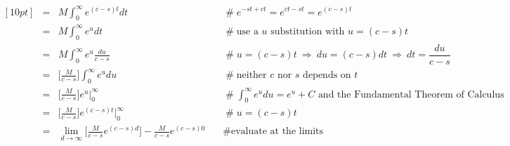 \documentclass{article}
\theoremstyle{definition}
\begin{document}
\begin{equation*}
\begin{array}{lllll}
[10pt]                                                                                 %
&=& M  \int_0^\infty  e^{(c-s)t}  dt                                      &\quad  \mathrel{\#}  e^{-st + ct} = e^{ct -st} = e^{(c-s)t}                                                                                                                                     \\      
[10pt]                                                                                 %
&=&  M \int_0^\infty e^u dt                                                &\quad  \mathrel{\#} \text{use a $u$ substitution with $u = (c-s)t$}                                                                                                                     \\     
[10pt]                                                                                 %
&=&  M \int_0^\infty e^u \frac{du}{c-s}                              &\quad  \mathrel{\#} u = (c-s)t  \: \Rightarrow \: du = (c-s) dt \: \Rightarrow \: dt = \dfrac{du}{c-s}                                                                       \\     
[10pt]                                                                                %
&=& \Big [ \frac{M}{c-s} \Big ] \int_0^\infty e^u du            &\quad  \mathrel{\#} \text{neither $c$ nor $s$ depends on $t$}                                                                                                                           \\     
[10pt]                                                                                %
&=& \Big [ \frac{M}{c-s} \Big ] e^u \Big |_0^\infty              &\quad  \mathrel{\#} \int_0^\infty e^u du = e^u +C \text{ and the Fundamental Theorem of Calculus}                                                                \\     
[10pt]                                                                                %
&=& \Big [ \frac{M}{c-s} \Big ]  e^{(c-s)t} \Big |_0^\infty     &\quad  \mathrel{\#} u = (c-s)t                                                                                                                                                                              \\
[10pt]                                                                                %
&=& \lim\limits_{d \to \infty}\Big [\frac{M}{c-s} e^{(c-s)d} \Big ] - \frac{M}{c - s}e^{(c-s)0}  &\quad \mathrel{\#} \text{evaluate at the limits}                                                                                                   \\

\end{array}
\end{equation*}
\end{document}
